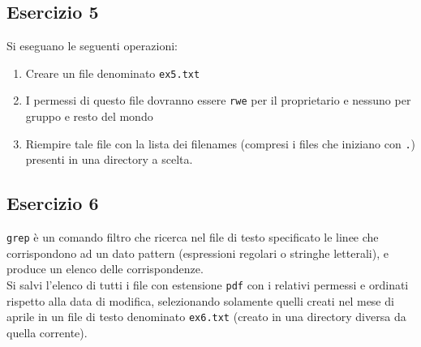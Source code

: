 \documentclass{article}
\def\code#1{\texttt{#1}}
\begin{document}
\subsection*{Esercizio 5}
Si eseguano le seguenti operazioni:
\begin{enumerate}
\item Creare un file denominato \code{ex5.txt}
\item I permessi di questo file dovranno essere \code{rwe} per il proprietario e nessuno per gruppo e resto del mondo
\item Riempire tale file con la lista dei filenames (compresi i files che iniziano con \code{.}) presenti in una directory a scelta.
\end{enumerate}

\subsection*{Esercizio 6}
\code{grep} è un comando filtro che ricerca nel file di testo specificato le linee che corrispondono ad un dato pattern (espressioni regolari o stringhe letterali), e produce un elenco delle corrispondenze.\\

Si salvi l'elenco di tutti i file con estensione \code{pdf} con i relativi permessi e ordinati rispetto alla data di modifica, selezionando solamente quelli creati nel mese di aprile in un file di testo denominato \code{ex6.txt} (creato in una directory diversa da quella corrente).
\end{document}
